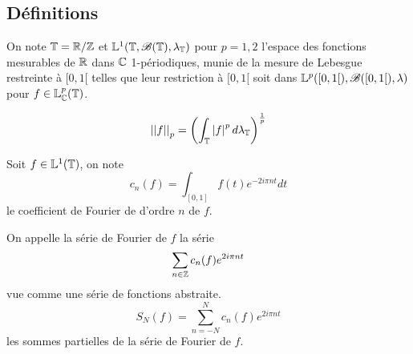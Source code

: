 \subsection{Définitions}


\begin{definition}
	On note $\mathbb{T} = \mathbb{R} / \mathbb{Z}$ et $\mathbb{L}^1(\mathbb{T}, \mathscr{B} (\mathbb{T}), \lambda_{\mathbb{T}})$ pour $p = 1,2$ l'espace des fonctions mesurables de $\mathbb{R}$ dans $\mathbb{C}$ 1-périodiques, munie de la mesure de Lebesgue restreinte à $[0,1[$
	telles que leur restriction à $[0,1[$ soit dans $\mathbb{L}^p([0,1[), \mathscr{B}([0,1[), \lambda)$ pour $f \in \mathbb{L}_{\mathbb{C}}^p(\mathbb{T})$.

	$$ {\left|\left|f\right|\right|}_p = \left( \int_{\mathbb{T}} \left|f\right|^p d\lambda_{\mathbb{T}} \right)^{\frac{1}{p}} $$
\end{definition}

\begin{definition}
	Soit $f \in \mathbb{L}^1(\mathbb{T})$, on note
	$$ c_n(f) = \int_{[0,1]} f(t) e^{-2i\pi nt} dt $$
	le coefficient de Fourier de d'ordre $n$ de $f$.

	On appelle la série de Fourier de $f$ la série
	$$ \sum_{n \in \mathbb{Z}} c_n(f) e^{2i\pi nt} $$
	vue comme une série de fonctions abstraite.
	$$ S_N(f) = \sum_{n = -N}^{N} c_n(f) e^{2i\pi nt} $$
	les sommes partielles de la série de Fourier de $f$.
\end{definition}
